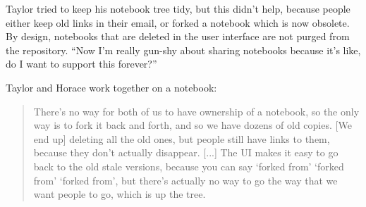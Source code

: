 Taylor tried to keep his notebook tree tidy, but this didn't help, because
people either keep old links in their email, or forked a notebook which is now
obsolete. By design, notebooks that are deleted in the user interface are not
purged from the repository. ``Now I'm really gun-shy about sharing notebooks
because it's like, do I want to support this forever?''

Taylor and Horace work together on a notebook:
\begin{quote}
There's no way for both of us
to have ownership of a notebook, so the only way is to fork it back and forth,
and so we have dozens of old copies. [We end up] deleting all the old ones, but
people still have links to them, because they don't actually disappear. [...]
The UI makes it easy to go back to the old stale versions, because you can say
`forked from' `forked from' `forked from', but there's actually no way to go the
way that we want people to go, which is up the tree.
\end{quote}

